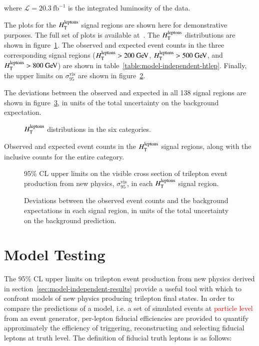 where $\mathcal{L}=20.3~\mbox{fb}^{-1}$ is the integrated luminosity of the data.

The plots for the $H_{\mathrm{T}}^{\mathrm{leptons}}$ signal regions are shown here for demonstrative purposes. The full set of plots is available at~\cite{model-independent-webpage}. The $H_{\mathrm{T}}^{\mathrm{leptons}}$ distributions are shown in figure~\ref{fig:model-independent-htlep}. The observed and expected event counts in the three corresponding signal regions ($\htlep>200 \GeV$, $\htlep>500 \GeV$, and $\htlep>800 \GeV$) are shown in table~\ref{table:model-independent-htlep}. Finally, the upper limits on $\sigma_{95}^{\mathrm{vis}}$ are shown in figure~\ref{fig:model-independent-htlep-sigmavis}. 

The deviations between the observed and expected in all 138 signal regions are shown in figure~\ref{fig:model-independent-summary-sigma}, in units of the total uncertainty on the background expectation. 

\begin{figure}[htbp]
	\centering

	\caption{$H_{\mathrm{T}}^{\mathrm{leptons}}$ distributions in the six categories.}
	\label{fig:model-independent-htlep}
\end{figure}

\begin{table}[htbp]
	\centering

	\caption{Observed and expected event counts in the $H_{\mathrm{T}}^{\mathrm{leptons}}$ signal regions, along with the inclusive counts for the entire category.}
	\label{table:model-independent-htlep}
\end{table}

\begin{figure}
	\centering

	\caption{95\% CL upper limits on the visible cross section of trilepton event production from new physics, $\sigma_{95}^{\mathrm{vis}}$, in each $H_{\mathrm{T}}^{\mathrm{leptons}}$ signal region. }
	\label{fig:model-independent-htlep-sigmavis}
\end{figure}

\begin{figure}
	\centering

	\caption{Deviations between the observed event counts and the background expectations in each signal region, in units of the total uncertainty on the background prediction.}
	\label{fig:model-independent-summary-sigma}
\end{figure}



\section{Model Testing}
The 95\% CL upper limits on trilepton event production from new physics derived in section~\ref{sec:model-independent-results} provide a useful tool with which to confront models of new physics producing trilepton final states. In order to compare the predictions of a model, i.e. a set of simulated events at \textcolor{red}{particle level} from an event generator, per-lepton fiducial efficiencies are provided to quantify approximately the efficiency of triggering, reconstructing and selecting fiducial leptons at truth level. The definition of fiducial truth leptons is as follows: 

